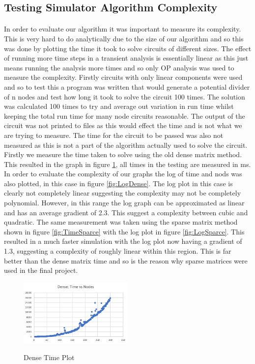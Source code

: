 \documentclass{article}
\begin{document}
\subsection{Testing Simulator Algorithm Complexity}
\paragraph{}
In order to evaluate our algorithm it was important to measure its complexity. This is very hard to do analytically due to the size of our algorithm and so this was done by plotting the time it took to solve circuits of different sizes. The effect of running more time steps in a transient analysis is essentially linear as this just means running the analysis more times and so only OP analysis was used to measure the complexity. Firstly circuits with only linear components were used and so to test this a program was written that would generate a potential divider of n nodes and test how long it took to solve the circuit 100 times. The solution was calculated 100 times to try and average out variation in run time whilst keeping the total run time for many node circuits reasonable. The output of the circuit was not printed to files as this would effect the time and is not what we are trying to measure. The time for the circuit to be passed was also not measured as this is not a part of the algorithm actually used to solve the circuit. Firstly we measure the time taken to solve using the old dense matrix method. This resulted in the graph in figure \ref{fig:TimeDense}, all times in the testing are measured in ms. In order to evaluate the complexity of our graphs the log of time and nods was also plotted, in this case in figure \ref{fig:LogDense}. The log plot in this case is clearly not completely linear suggesting the complexity may not be completely polynomial. However, in this range the log graph can be approximated as linear and has an average gradient of 2.3. This suggest a complexity between cubic and quadratic. The same measurement was taken using the sparse matrix method shown in figure \ref{fig:TimeSparce} with the log plot in figure \ref{fig:LogSparce}. This resulted in a much faster simulation with the log plot now having a gradient of 1.3, suggesting a complexity of roughly linear within this region. This is far better than the dense matrix time and so is the reason why sparse matrices were used in the final project. \\
\begin{figure}[!h]
    \caption{Dense Time Plot}
    \centering
    \includegraphics[width=0.5\textwidth]{images/TimeDense.png}
    \label{fig:TimeDense}
\end{figure}
\end{document}
